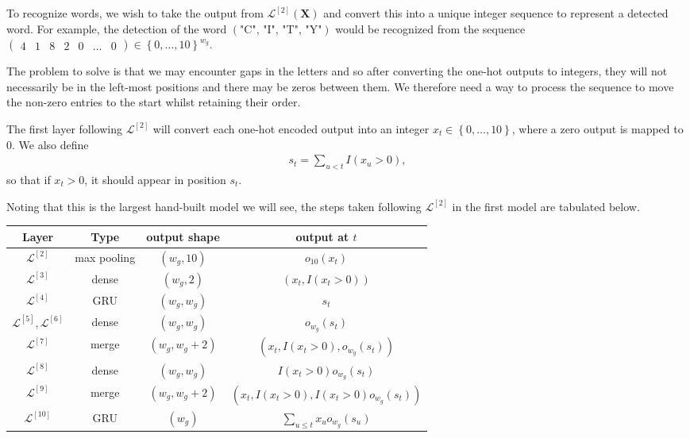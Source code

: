\documentclass{somasmsc}
\begin{document}
To recognize words, we wish to take the output from $\mathcal{L}^{\left[2\right]}\left(\mathbf{X}\right)$ and convert this into a unique integer sequence to represent a detected word. For example, the detection of the word $\left(\text{"C", "I", "T", "Y"}\right)$ would be recognized from the sequence
$\begin{pmatrix}
    4 & 1 & 8 & 2 & 0 & \dots & 0
\end{pmatrix} \in \left\{0, \dots, 10\right\}^{w_g}$.

The problem to solve is that we may encounter gaps in the letters and so after converting the one-hot outputs to integers, they will not necessarily be in the left-most positions and there may be zeros between them. We therefore need a way to process the sequence to move the non-zero entries to the start whilst retaining their order.

The first layer following $\mathcal{L}^{\left[2\right]}$ will convert each one-hot encoded output into an integer $x_t \in \left\{0, \dots, 10\right\}$, where a zero output is mapped to 0. We also define
\begin{align*}
    s_t = \sum_{u < t} I(x_u > 0),
\end{align*}
so that if $x_t > 0$, it should appear in position $s_t$.

Noting that this is the largest hand-built model we will see, the steps taken following $\mathcal{L}^{\left[2\right]}$ in the first model are tabulated below.

\begin{table}[h!]
\centering
\begin{tabular}{ |c|c|c|c| }
 \hline
  Layer & Type & output shape & output at $t$ \\
 \hline
 $\mathcal{L}^{\left[2\right]}$ & max pooling & $\left(w_g, 10\right)$   & $o_{10}(x_t)$ \\
 $\mathcal{L}^{\left[3\right]}$ & dense & $\left(w_g, 2\right)$ & $\left(x_t, I(x_t > 0)\right)$ \\
 $\mathcal{L}^{\left[4\right]}$ & GRU & $\left(w_g, w_g\right)$  & $s_t$ \\
 $\mathcal{L}^{\left[5\right]}, \mathcal{L}^{\left[6\right]}$ & dense & $\left(w_g, w_g\right)$  & $o_{w_g}(s_t)$ \\
 $\mathcal{L}^{\left[7\right]}$ & merge & $\left(w_g, w_g + 2\right)$ & $\left(x_t, I(x_t > 0), o_{w_g}(s_t)\right)$ \\
 $\mathcal{L}^{\left[8\right]}$ & dense & $\left(w_g, w_g\right)$ & $I(x_t > 0) o_{w_g}(s_t)$ \\
 $\mathcal{L}^{\left[9\right]}$ & merge & $\left(w_g, w_g + 2\right)$ & $\left(x_t, I(x_t > 0), I(x_t > 0) o_{w_g}(s_t)\right)$ \\
 $\mathcal{L}^{\left[10\right]}$ & GRU & $\left(w_g\right)$ & $\sum_{u \leq t} x_u o_{w_g}(s_u)$ \\
 \hline
\end{tabular}
\label{letters:t1}
\end{table}
\end{document}
